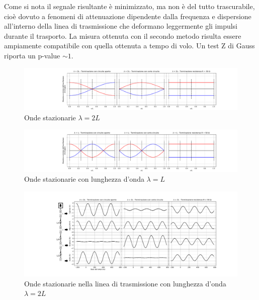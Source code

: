 \documentclass[journal]{IEEEtran}
\begin{document}
Come si nota il segnale risultante è minimizzato, ma non è del tutto trascurabile, cioè dovuto a fenomeni di attenuazione dipendente dalla frequenza e dispersione all'interno della linea di trasmissione che deformano leggermente gli impulsi durante il trasporto.
La misura ottenuta con il secondo metodo risulta essere ampiamente compatibile con quella ottenuta a tempo di volo. Un test Z di Gauss riporta un p-value $\sim 1$.


\begin{figure}[h]%
\centering
\begin{center}
\includegraphics[trim = {200pt 0 0 0}, width=1.1\textwidth]{analysis/output/Delay_line_standingWave2L.pdf}
\caption{Onde stazionarie $\lambda = 2L$}
\label{fig: "onde staz 2L}
\end{center}
\end{figure}

\begin{figure}[h]%
\centering
\begin{center}
\includegraphics[trim = {200pt 0 0 0}, width=1.1\textwidth]{analysis/output/Delay_line_standingWaveL.pdf}
\caption{Onde stazionarie con lunghezza d'onda $\lambda = L$}
\label{fig: onde staz L}
\end{center}
\end{figure}


\begin{figure}[h]%
\includegraphics[trim = {200pt 0 0 0}, clip, width=1.1\textwidth]{analysis/output/Delay_line_lambda2L.pdf}
\caption{Onde stazionarie nella linea di trasmissione con lunghezza d'onda $\lambda = 2L$}
\label{fig: delayline 2L}

\end{figure}
\end{document}
